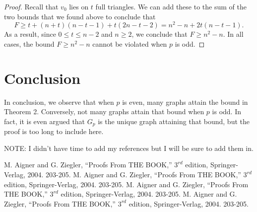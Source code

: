 \documentclass[10pt]{amsart}
\begin{document}
\begin{proof}
    Recall that $v_0$ lies on $t$ full triangles. We can add these to the sum of the two bounds that
    we found above to conclude that
    $$ F \ge t + (n + t)(n - t - 1) + t(2n - t - 2) = n^2 - n + 2t(n - t - 1). $$
    As a result, since $0 \le t \le n - 2$ and $n \ge 2$, we conclude that $F \ge n^2 - n$.
    In all cases, the bound $F \ge n^2 - n$ cannot be violated when $p$ is odd.
\end{proof}


\section{Conclusion}

In conclusion, we observe that when $p$ is even, many graphs attain the bound in Theorem 2. Conversely,
not many graphs attain that bound when $p$ is odd. In fact, it is even argued that $G_p$ is the unique 
graph attaining that bound, but the proof is too long to include here.

NOTE: I didn't have time to add my references but I will be sure to add them in.



\begin{thebibliography}{10}
 M. Aigner and G. Ziegler, ``Proofs From THE BOOK,'' $3^{rd}$ edition, Springer-Verlag, 2004. 203-205.
 M. Aigner and G. Ziegler, ``Proofs From THE BOOK,'' $3^{rd}$ edition, Springer-Verlag, 2004. 203-205.
 M. Aigner and G. Ziegler, ``Proofs From THE BOOK,'' $3^{rd}$ edition, Springer-Verlag, 2004. 203-205.
 M. Aigner and G. Ziegler, ``Proofs From THE BOOK,'' $3^{rd}$ edition, Springer-Verlag, 2004. 203-205.
\end{thebibliography}
\end{document}
